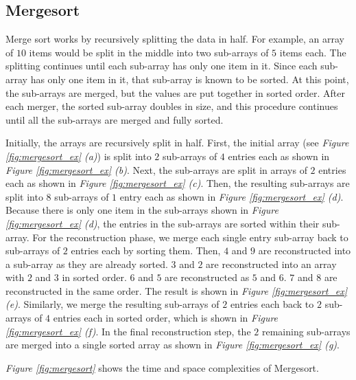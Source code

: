 \subsection{Mergesort}

Merge sort works by recursively splitting the data in half. For example, an array of $10$ items would be split in the middle into two sub-arrays of $5$ items each. The splitting continues until each sub-array has only one item in it. Since each sub-array has only one item in it, that sub-array is known to be sorted. At this point, the sub-arrays are merged, but the values are put together in sorted order. After each merger, the sorted sub-array doubles in size, and this procedure continues until all the sub-arrays are merged and fully sorted.

Initially, the arrays are recursively split in half. First, the initial array (see \textit{Figure \ref{fig:mergesort_ex} (a)}) is split into $2$ sub-arrays of $4$ entries each as shown in \textit{Figure \ref{fig:mergesort_ex} (b)}. Next, the sub-arrays are split in arrays of $2$ entries each as shown in \textit{Figure \ref{fig:mergesort_ex} (c)}. Then, the resulting sub-arrays are split into $8$ sub-arrays of $1$ entry each as shown in \textit{Figure \ref{fig:mergesort_ex} (d)}. Because there is only one item in the sub-arrays shown in \textit{Figure \ref{fig:mergesort_ex} (d)}, the entries in the sub-arrays are sorted within their sub-array. For the reconstruction phase, we merge each single entry sub-array back to sub-arrays of $2$ entries each by sorting them. Then, $4$ and $9$ are reconstructed into a sub-array as they are already sorted. $3$ and $2$ are reconstructed into an array with $2$ and $3$ in sorted order. $6$ and $5$ are reconstructed as $5$ and $6$. $7$ and $8$ are reconstructed in the same order. The result is shown in \textit{Figure \ref{fig:mergesort_ex} (e)}. Similarly, we merge the resulting sub-arrays of $2$ entries each back to $2$ sub-arrays of $4$ entries each in sorted order, which is shown in \textit{Figure \ref{fig:mergesort_ex} (f)}. In the final reconstruction step, the $2$ remaining sub-arrays are merged into a single sorted array as shown in \textit{Figure \ref{fig:mergesort_ex} (g)}.

\textit{Figure \ref{fig:mergesort}} shows the time and space complexities of Mergesort.

